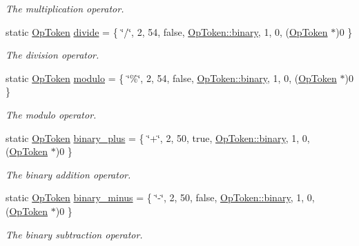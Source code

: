 \begin{DoxyCompactItemize}
\begin{DoxyCompactList}\small\item\em The {\itshape multiplication} operator. \end{DoxyCompactList}\item 
static \mbox{\hyperlink{class_op_token}{Op\+Token}} \mbox{\hyperlink{class_print_c_a28bc4b767b118dfad5f43aaadb10eaf4}{divide}} = \{ \char`\"{}/\char`\"{}, 2, 54, false, \mbox{\hyperlink{class_op_token_af41c7f108d5662ede7765c5a6c44eaffa3a2ec63522a9329a71ddbe8adc3e752d}{Op\+Token\+::binary}}, 1, 0, (\mbox{\hyperlink{class_op_token}{Op\+Token}} $\ast$)0 \}
\begin{DoxyCompactList}\small\item\em The {\itshape division} operator. \end{DoxyCompactList}\item 
static \mbox{\hyperlink{class_op_token}{Op\+Token}} \mbox{\hyperlink{class_print_c_abcaccebfae7e0ddc773839bf7418a2ac}{modulo}} = \{ \char`\"{}\%\char`\"{}, 2, 54, false, \mbox{\hyperlink{class_op_token_af41c7f108d5662ede7765c5a6c44eaffa3a2ec63522a9329a71ddbe8adc3e752d}{Op\+Token\+::binary}}, 1, 0, (\mbox{\hyperlink{class_op_token}{Op\+Token}} $\ast$)0 \}
\begin{DoxyCompactList}\small\item\em The {\itshape modulo} operator. \end{DoxyCompactList}\item 
static \mbox{\hyperlink{class_op_token}{Op\+Token}} \mbox{\hyperlink{class_print_c_a17d2d8af95be1fddc38c0bf50be81793}{binary\+\_\+plus}} = \{ \char`\"{}+\char`\"{}, 2, 50, true, \mbox{\hyperlink{class_op_token_af41c7f108d5662ede7765c5a6c44eaffa3a2ec63522a9329a71ddbe8adc3e752d}{Op\+Token\+::binary}}, 1, 0, (\mbox{\hyperlink{class_op_token}{Op\+Token}} $\ast$)0 \}
\begin{DoxyCompactList}\small\item\em The {\itshape binary} {\itshape addition} operator. \end{DoxyCompactList}\item 
static \mbox{\hyperlink{class_op_token}{Op\+Token}} \mbox{\hyperlink{class_print_c_a3e8face6aa64fd484de1a532f837db5b}{binary\+\_\+minus}} = \{ \char`\"{}-\/\char`\"{}, 2, 50, false, \mbox{\hyperlink{class_op_token_af41c7f108d5662ede7765c5a6c44eaffa3a2ec63522a9329a71ddbe8adc3e752d}{Op\+Token\+::binary}}, 1, 0, (\mbox{\hyperlink{class_op_token}{Op\+Token}} $\ast$)0 \}
\begin{DoxyCompactList}\small\item\em The {\itshape binary} {\itshape subtraction} operator. \end{DoxyCompactList}\item 

\end{DoxyCompactItemize}
